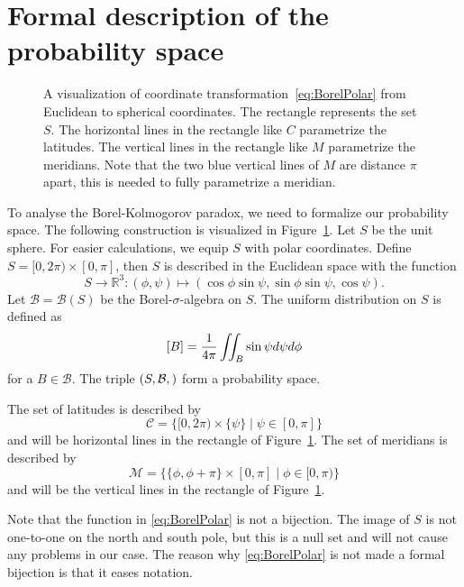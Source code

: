 \documentclass[a4paper]{report}
\theoremstyle{plain}
\theoremstyle{definition}
\theoremstyle{remark}
\numberwithin{equation}{chapter}
\newcommand{\R}{\mathbb{R}}
\let\P\relax
\DeclareMathOperator{\P}{\mathbb{P}}
\DeclareMathOperator{\1}{\mathbbm{1}}
\newcommand{\B}{\mathcal{B}}
\begin{document}
\section{Formal description of the probability space}
\begin{figure}
\centering{

}
\caption{A visualization of coordinate transformation~\eqref{eq:BorelPolar} from Euclidean to spherical coordinates. The rectangle represents the set $S$. The horizontal lines in the rectangle like $C$ parametrize the latitudes. The vertical lines in the rectangle like $M$ parametrize the meridians. Note that the two blue vertical lines of $M$ are distance $\pi$ apart, this is needed to fully parametrize a meridian.}
\label{fig:BorelVis}
\end{figure}

To analyse the Borel-Kolmogorov paradox, we need to formalize our probability space. The following construction is visualized in Figure~\ref{fig:BorelVis}. Let $S$ be the unit sphere. For easier calculations, we equip $S$ with polar coordinates. Define $S=[0,2\pi)\times[0,\pi]$, then $S$ is described in the Euclidean space with the function
\begin{equation}\label{eq:BorelPolar}
S\to\R^3:(\phi,\psi)\mapsto(\cos\phi\sin\psi,\sin\phi\sin\psi,\cos\psi).
\end{equation}
Let $\B=\B(S)$ be the Borel-$\sigma$-algebra on $S$. The uniform distribution on $S$ is defined as
\begin{equation}
\P[B]=\frac{1}{4\pi}\iint_B\sin\psi d\psi d\phi
\end{equation}
for a $B\in\B$. The triple $(S,\B,\P)$ form a probability space.

The set of latitudes is described by 
\begin{equation}
\mathcal{C}=\{[0,2\pi)\times\{\psi\}\mid\psi\in[0,\pi]\}
\end{equation}
and will be horizontal lines in the rectangle of Figure~\ref{fig:BorelVis}. The set of meridians is described by
\begin{equation}
\mathcal{M}=\{\{\phi,\phi+\pi\}\times[0,\pi]\mid\phi\in[0,\pi)\}
\end{equation}
and will be the vertical lines in the rectangle of Figure~\ref{fig:BorelVis}.

Note that the function in \eqref{eq:BorelPolar} is not a bijection. The image of $S$ is not one-to-one on the north and south pole, but this is a null set and will not cause any problems in our case. The reason why \eqref{eq:BorelPolar} is not made a formal bijection is that it eases notation.
\end{document}
